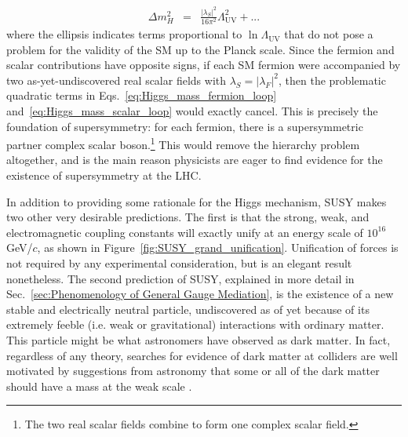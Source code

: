 \documentclass[dissertation.tex]{subfiles}
\begin{document}
\begin{eqnarray}
\Delta m_{H}^{2} &=& \frac{|\lambda_{S}|^{2}}{16\pi^{2}}\Lambda_{\mathrm{UV}}^{2} + ...
\label{eq:Higgs_mass_scalar_loop}
\end{eqnarray}
%
where the ellipsis indicates terms proportional to $\ln\Lambda_{\mathrm{UV}}$ that do not pose a problem for the validity of the SM up to the Planck scale.  Since the fermion and scalar contributions have opposite signs, if each SM fermion were accompanied by two as-yet-undiscovered real scalar fields with $\lambda_{S} = |\lambda_{F}|^{2}$, then the problematic quadratic terms in Eqs.~\ref{eq:Higgs_mass_fermion_loop} and~\ref{eq:Higgs_mass_scalar_loop} would exactly cancel.  This is precisely the foundation of supersymmetry: for each fermion, there is a supersymmetric partner complex scalar boson.\footnote{The two real scalar fields combine to form one complex scalar field.}  This would remove the hierarchy problem altogether, and is the main reason physicists are eager to find evidence for the existence of supersymmetry at the LHC.

In addition to providing some rationale for the Higgs mechanism, SUSY makes two other very desirable predictions.  The first is that the strong, weak, and electromagnetic coupling constants will exactly unify at an energy scale of $10^{16}$ GeV/$c$, as shown in Figure~\ref{fig:SUSY_grand_unification}.  Unification of forces is not required by any experimental consideration, but is an elegant result nonetheless.  The second prediction of SUSY, explained in more detail in Sec.~\ref{sec:Phenomenology of General Gauge Mediation}, is the existence of a new stable and electrically neutral particle, undiscovered as of yet because of its extremely feeble (i.e. weak or gravitational) interactions with ordinary matter.  This particle might be what astronomers have observed as dark matter.  In fact, regardless of any theory, searches for evidence of dark matter at colliders are well motivated by suggestions from astronomy that some or all of the dark matter should have a mass at the weak scale \cite{Jungman1996195}.
\end{document}
